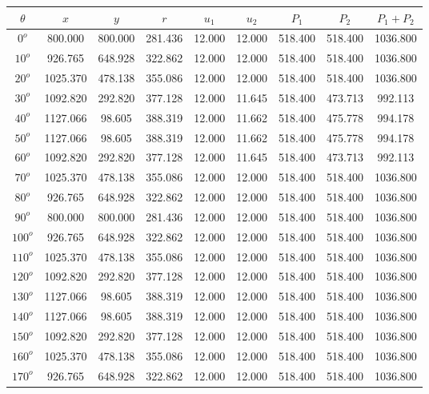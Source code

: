     \singlespacing
    \begin{table}[H]
        \centering
        \begin{tabular}{|c|c|c|c|c|c|c|c|c|} \hline
    $\theta$ &$x$ &$y$ &$r$ &$u_1$ &$u_2$ &$P_1$ &$P_2$ &$P_1 + P_2$ \\ \hline
$0^o$	&800.000	&800.000	&281.436	&12.000	&12.000	&518.400	&518.400	&1036.800 \\ \hline
$10^o$	&926.765	&648.928	&322.862	&12.000	&12.000	&518.400	&518.400	&1036.800 \\ \hline
$20^o$	&1025.370	&478.138	&355.086	&12.000	&12.000	&518.400	&518.400	&1036.800 \\ \hline
$30^o$	&1092.820	&292.820	&377.128	&12.000	&11.645	&518.400	&473.713	&992.113 \\ \hline
$40^o$	&1127.066	&98.605	&388.319	&12.000	&11.662	&518.400	&475.778	&994.178 \\ \hline
$50^o$	&1127.066	&98.605	&388.319	&12.000	&11.662	&518.400	&475.778	&994.178 \\ \hline
$60^o$	&1092.820	&292.820	&377.128	&12.000	&11.645	&518.400	&473.713	&992.113 \\ \hline
$70^o$	&1025.370	&478.138	&355.086	&12.000	&12.000	&518.400	&518.400	&1036.800 \\ \hline
$80^o$	&926.765	&648.928	&322.862	&12.000	&12.000	&518.400	&518.400	&1036.800 \\ \hline
$90^o$	&800.000	&800.000	&281.436	&12.000	&12.000	&518.400	&518.400	&1036.800 \\ \hline
$100^o$	&926.765	&648.928	&322.862	&12.000	&12.000	&518.400	&518.400	&1036.800 \\ \hline
$110^o$	&1025.370	&478.138	&355.086	&12.000	&12.000	&518.400	&518.400	&1036.800 \\ \hline
$120^o$	&1092.820	&292.820	&377.128	&12.000	&12.000	&518.400	&518.400	&1036.800 \\ \hline
$130^o$	&1127.066	&98.605	&388.319	&12.000	&12.000	&518.400	&518.400	&1036.800 \\ \hline
$140^o$	&1127.066	&98.605	&388.319	&12.000	&12.000	&518.400	&518.400	&1036.800 \\ \hline
$150^o$	&1092.820	&292.820	&377.128	&12.000	&12.000	&518.400	&518.400	&1036.800 \\ \hline
$160^o$	&1025.370	&478.138	&355.086	&12.000	&12.000	&518.400	&518.400	&1036.800 \\ \hline
$170^o$	&926.765	&648.928	&322.862	&12.000	&12.000	&518.400	&518.400	&1036.800 \\ \hline

\end{tabular}
\end{table}
